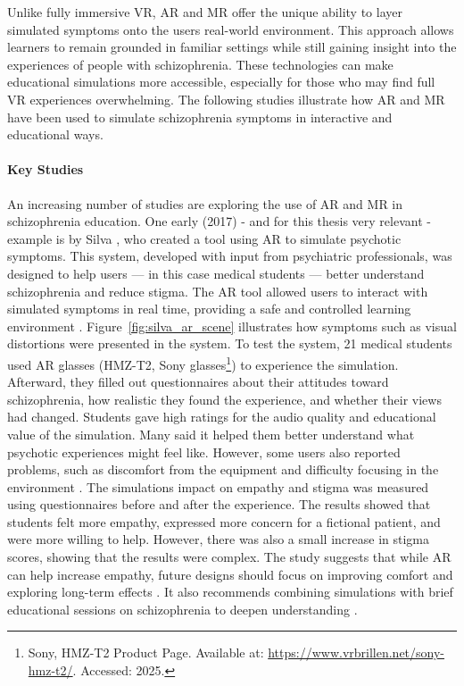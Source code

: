 Unlike fully immersive VR, AR and MR offer the unique ability to layer simulated symptoms onto the users real-world environment. This approach allows learners to remain grounded in familiar settings while still gaining insight into the experiences of people with schizophrenia. These technologies can make educational simulations more accessible, especially for those who may find full VR experiences overwhelming. The following studies illustrate how AR and MR have been used to simulate schizophrenia symptoms in interactive and educational ways.

\paragraph{Key Studies}
\label{sec:keystudies}

An increasing number of studies are exploring the use of AR and MR in schizophrenia education. One early (2017) - and for this thesis very relevant - example is by Silva \cite{Silva2017}, who created a tool using AR to simulate psychotic symptoms. This system, developed with input from psychiatric professionals, was designed to help users — in this case medical students — better understand schizophrenia and reduce stigma. The AR tool allowed users to interact with simulated symptoms in real time, providing a safe and controlled learning environment \cite{Silva2017}. Figure~\ref{fig:silva_ar_scene} illustrates how symptoms such as visual distortions were presented in the system. To test the system, 21 medical students used AR glasses (HMZ-T2, Sony glasses\footnote{Sony, HMZ-T2 Product Page. Available at: \url{https://www.vrbrillen.net/sony-hmz-t2/}. Accessed: 2025.}) to experience the simulation. Afterward, they filled out questionnaires about their attitudes toward schizophrenia, how realistic they found the experience, and whether their views had changed. Students gave high ratings for the audio quality and educational value of the simulation. Many said it helped them better understand what psychotic experiences might feel like. However, some users also reported problems, such as discomfort from the equipment and difficulty focusing in the environment \cite{Silva2017}. The simulations impact on empathy and stigma was measured using questionnaires before and after the experience. The results showed that students felt more empathy, expressed more concern for a fictional patient, and were more willing to help. However, there was also a small increase in stigma scores, showing that the results were complex. The study suggests that while AR can help increase empathy, future designs should focus on improving comfort and exploring long-term effects \cite{Silva2017}. It also recommends combining simulations with brief educational sessions on schizophrenia to deepen understanding \cite{Silva2017}. 


